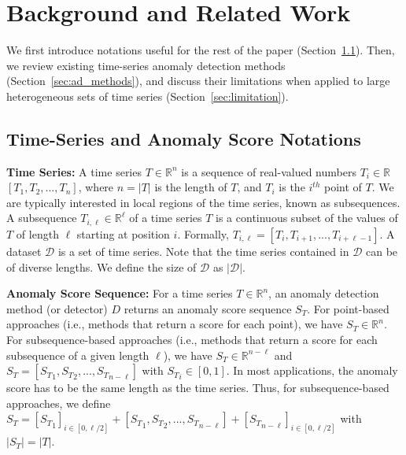 \vspace{-0.1cm}
\section{Background and Related Work}
\label{sec:background}

We first introduce %
notations useful for the rest of the paper (Section~\ref{sec:notation}). Then, we review %
existing time-series anomaly detection methods (Section~\ref{sec:ad_methods}), and discuss their limitations when applied to large heterogeneous sets of time series (Section~\ref{sec:limitation}). 


\vspace{-0.2cm}
\subsection{Time-Series and Anomaly Score Notations}
\label{sec:notation}


\textbf{Time Series: }A time series $T \in \mathbb{R}^n $ is a sequence of real-valued numbers $T_i\in\mathbb{R}$ $[T_1,T_2,...,T_n]$, where $n=|T|$ is the length of $T$, and $T_i$ is the $i^{th}$ point of $T$. We are typically interested in local regions of the time series, known as subsequences. A subsequence $T_{i,\ell} \in \mathbb{R}^\ell$ of a time series $T$ is a continuous subset of the values of $T$ of length $\ell$ starting at position $i$. Formally, $T_{i,\ell} = [T_i, T_{i+1},...,T_{i+\ell-1}]$. %
A dataset $\mathcal{D}$ is a set of time series. 
Note that the time series contained in $\mathcal{D}$ can be of diverse lengths. We define the size of $\mathcal{D}$ as $|\mathcal{D}|$.

\textbf{Anomaly Score Sequence: }For a time series $T \in \mathbb{R}^n $, an anomaly detection method (or detector) $D$ returns an anomaly score sequence $S_T$. For point-based approaches (i.e., methods that return a score for each point), we have $S_T \in \mathbb{R}^n$. For subsequence-based approaches (i.e., methods that return a score for each subsequence of a given length $\ell$), we have $S_T \in \mathbb{R}^{n-\ell}$ and $S_T = [{S_T}_1,{S_T}_2,...,{S_T}_{n-\ell}]$ with ${S_T}_i \in [0,1]$. In most applications, the anomaly score has to be the same length as the time series. Thus, for subsequence-based approaches, we define $S_T = [{S_T}_1]_{i\in[0,\ell/2]} + [{S_T}_1,{S_T}_2,...,{S_T}_{n-\ell}] + [{S_T}_{n-\ell}]_{i\in[0,\ell/2]}$ with $|S_T| = |T|$.

